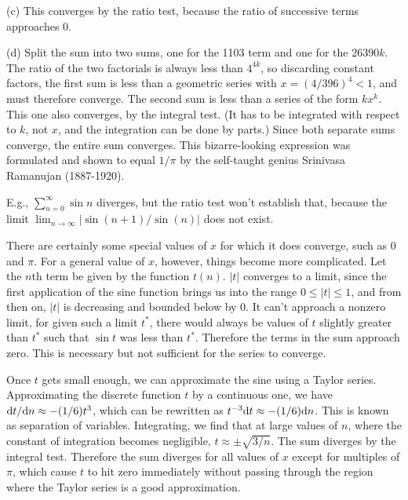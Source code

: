 (c) This converges by the ratio test, because the ratio of successive terms approaches 0.

(d) Split the sum into two sums, one for the 1103 term and one for the $26390k$. The ratio of the two factorials is always less than $4^{4k}$, so
discarding constant factors, the first sum is less than a geometric series with $x=(4/396)^4<1$, and must therefore converge. The second sum is less than a series of the form $kx^k$.
This one also converges, by the integral test. (It has to be integrated with respect to $k$, not $x$, and the integration can be done by parts.) Since both separate sums converge,
the entire sum converges. This bizarre-looking expression was formulated and shown to equal $1/\pi$ by the self-taught genius Srinivasa Ramanujan (1887-1920).

E.g., $\sum_{n=0}^\infty \sin n$ diverges, but the ratio test won't establish that, because
the limit $\lim_{n\rightarrow\infty}|\sin(n+1)/\sin(n)|$ does not exist.

There are certainly some special values of $x$ for which it does converge, such as 0 and $\pi$.
For a general value of $x$, however, things become more complicated. Let the $n$th term be given by the function $t(n)$.
$|t|$ converges to a limit, since the first application of the sine function brings us into the range $0\le |t|\le 1$,
and from then on, $|t|$ is decreasing and bounded below by 0. It can't approach a nonzero limit, for given such a limit $t^*$,
there would always be values of $t$ slightly greater than $t^*$ such that $\sin t$ was less than $t^*$. Therefore the terms
in the sum approach zero. This is necessary but not sufficient for the series to converge.

Once $t$ gets small enough, we can approximate the sine
using a Taylor series. Approximating the discrete function $t$ by a continuous one,
we have $\textup{d} t/\textup{d} n\approx -(1/6)t^3$, which can be rewritten as $t^{-3}\textup{d} t\approx -(1/6)\textup{d} n$. This is known as
separation of variables. Integrating, we find that at large values of $n$, where the constant of integration becomes negligible,
$t\approx \pm\sqrt{3/n}$. The sum diverges by the integral test. Therefore the sum diverges for all values of $x$ except for
multiples of $\pi$, which cause $t$ to hit zero immediately without passing through the region where the Taylor series
is a good approximation.
